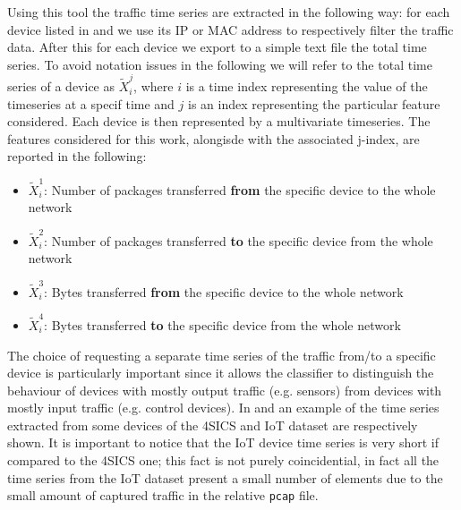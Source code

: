 Using this tool the traffic time series are extracted in the following way: for each device listed in  and  we use its IP or MAC address to respectively filter the traffic data. After this for each device we export to a simple text file the total time series. To avoid notation issues in the following we will refer to the total time series of a device as ${\tilde{X}_i^j}$, where $i$ is a time index representing the value of the timeseries at a specif time and $j$ is an index representing the particular feature considered. 
Each device is then represented by a multivariate timeseries. The features considered for this work, alongisde with the associated j-index, are reported in the following:
\begin{itemize}[noitemsep]
    \item ${\tilde{X}_i^1}$: Number of packages transferred \textbf{from} the specific device to the whole network
    \item ${\tilde{X}_i^2}$: Number of packages transferred \textbf{to} the specific device from the whole network
    \item ${\tilde{X}_i^3}$: Bytes transferred \textbf{from} the specific device to the whole network
    \item ${\tilde{X}_i^4}$: Bytes transferred \textbf{to} the specific device from the whole network
\end{itemize}

The choice of requesting a separate time series of the traffic from/to a specific device is particularly important since it allows the classifier to distinguish the behaviour of devices with mostly output traffic (e.g. sensors) from devices with mostly input traffic (e.g. control devices).
In  and  an example of the time series extracted from some devices of the 4SICS and IoT dataset are respectively shown. It is important to notice that the IoT device time series is very short if compared to the 4SICS one; this fact is not purely coincidential, in fact all the time series from the IoT dataset present a small number of elements due to the small amount of captured traffic in the relative \texttt{pcap} file.


